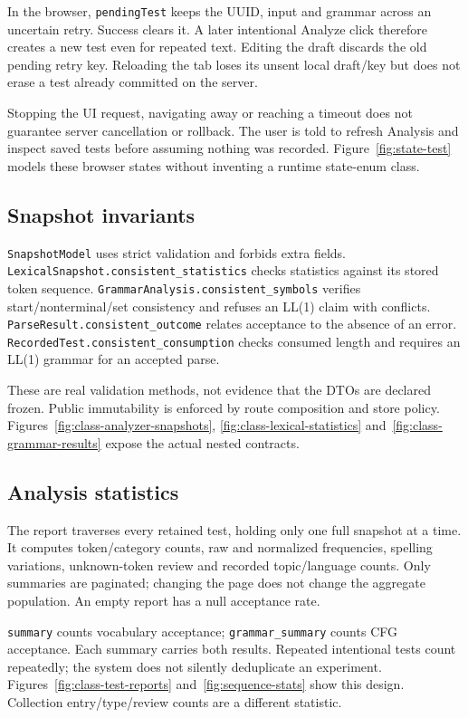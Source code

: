\documentclass[11pt,a4paper]{article}
\begin{document}
In the browser, \texttt{pendingTest} keeps the UUID, input and grammar across an
uncertain retry. Success clears it. A later intentional Analyze click therefore
creates a new test even for repeated text. Editing the draft discards the old
pending retry key. Reloading the tab loses its unsent local draft/key but does
not erase a test already committed on the server.

Stopping the UI request, navigating away or reaching a timeout does not
guarantee server cancellation or rollback. The user is told to refresh Analysis
and inspect saved tests before assuming nothing was recorded.
Figure~\ref{fig:state-test} models these browser states without inventing a
runtime state-enum class.

\subsection{Snapshot invariants}
\texttt{SnapshotModel} uses strict validation and forbids extra fields.
\nolinkurl{LexicalSnapshot.consistent_statistics} checks statistics against its
stored token sequence. \nolinkurl{GrammarAnalysis.consistent_symbols} verifies
start/nonterminal/set consistency and refuses an LL(1) claim with conflicts.
\nolinkurl{ParseResult.consistent_outcome} relates acceptance to the absence of an
error. \nolinkurl{RecordedTest.consistent_consumption} checks consumed length and
requires an LL(1) grammar for an accepted parse.

These are real validation methods, not evidence that the DTOs are declared
frozen. Public immutability is enforced by route composition and store policy.
Figures~\ref{fig:class-analyzer-snapshots}, \ref{fig:class-lexical-statistics}
and~\ref{fig:class-grammar-results} expose the actual nested contracts.

\subsection{Analysis statistics}
The report traverses every retained test, holding only one full snapshot at a
time. It computes token/category counts, raw and normalized frequencies,
spelling variations, unknown-token review and recorded topic/language counts.
Only summaries are paginated; changing the page does not change the aggregate
population. An empty report has a null acceptance rate.

\texttt{summary} counts vocabulary acceptance; \texttt{grammar\_summary} counts
CFG acceptance. Each summary carries both results. Repeated intentional tests
count repeatedly; the system does not silently deduplicate an experiment.
Figures~\ref{fig:class-test-reports} and~\ref{fig:sequence-stats} show this design.
Collection entry/type/review counts are a different statistic.
\end{document}
